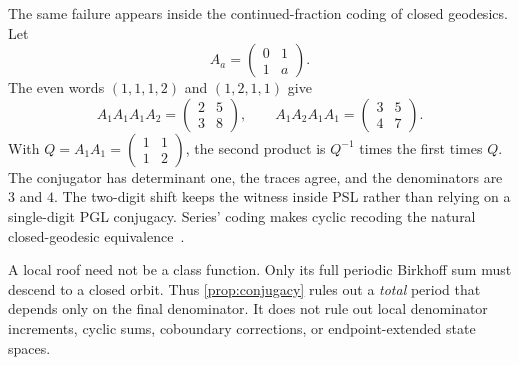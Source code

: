 The same failure appears inside the continued-fraction coding of closed
geodesics.  Let
\[
 A_a=\begin{pmatrix}0&1\\1&a\end{pmatrix}.
\]
The even words $(1,1,1,2)$ and $(1,2,1,1)$ give
\[
 A_1A_1A_1A_2=\begin{pmatrix}2&5\\3&8\end{pmatrix},\qquad
 A_1A_2A_1A_1=\begin{pmatrix}3&5\\4&7\end{pmatrix}.
\]
With $Q=A_1A_1=\left(\begin{smallmatrix}1&1\\1&2\end{smallmatrix}\right)$,
the second product is $Q^{-1}$ times the first times $Q$.  The conjugator has
determinant one, the traces agree, and the denominators are $3$ and $4$.
The two-digit shift keeps the witness inside PSL rather than relying on a
single-digit PGL conjugacy.  Series' coding makes cyclic recoding the natural
closed-geodesic equivalence~\cite{Series1985}.

\begin{remark}
A local roof need not be a class function.  Only its full periodic Birkhoff
sum must descend to a closed orbit.  Thus \cref{prop:conjugacy} rules out a
\emph{total} period that depends only on the final denominator.  It does not
rule out local denominator increments, cyclic sums, coboundary corrections,
or endpoint-extended state spaces.
\end{remark}
